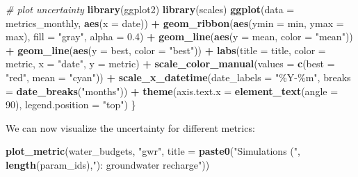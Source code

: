 \documentclass[
]{book}
\newenvironment{Shaded}{\begin{snugshade}}{\end{snugshade}}
\newcommand{\AttributeTok}[1]{\textcolor[rgb]{0.13,0.29,0.53}{#1}}
\newcommand{\CommentTok}[1]{\textcolor[rgb]{0.56,0.35,0.01}{\textit{#1}}}
\newcommand{\DecValTok}[1]{\textcolor[rgb]{0.00,0.00,0.81}{#1}}
\newcommand{\FloatTok}[1]{\textcolor[rgb]{0.00,0.00,0.81}{#1}}
\newcommand{\FunctionTok}[1]{\textcolor[rgb]{0.13,0.29,0.53}{\textbf{#1}}}
\newcommand{\NormalTok}[1]{#1}
\newcommand{\SpecialCharTok}[1]{\textcolor[rgb]{0.81,0.36,0.00}{\textbf{#1}}}
\newcommand{\StringTok}[1]{\textcolor[rgb]{0.31,0.60,0.02}{#1}}
\begin{document}
\begin{Shaded}
\begin{Highlighting}[]
  \CommentTok{\# plot uncertainty}
  \FunctionTok{library}\NormalTok{(ggplot2)}
  \FunctionTok{library}\NormalTok{(scales)}
  \FunctionTok{ggplot}\NormalTok{(}\AttributeTok{data =}\NormalTok{ metrics\_monthly, }\FunctionTok{aes}\NormalTok{(}\AttributeTok{x =}\NormalTok{ date)) }\SpecialCharTok{+}
    \FunctionTok{geom\_ribbon}\NormalTok{(}\FunctionTok{aes}\NormalTok{(}\AttributeTok{ymin =}\NormalTok{ min, }\AttributeTok{ymax =}\NormalTok{ max), }\AttributeTok{fill =} \StringTok{"gray"}\NormalTok{, }\AttributeTok{alpha =} \FloatTok{0.4}\NormalTok{) }\SpecialCharTok{+}
    \FunctionTok{geom\_line}\NormalTok{(}\FunctionTok{aes}\NormalTok{(}\AttributeTok{y =}\NormalTok{ mean, }\AttributeTok{color =} \StringTok{"mean"}\NormalTok{)) }\SpecialCharTok{+}
    \FunctionTok{geom\_line}\NormalTok{(}\FunctionTok{aes}\NormalTok{(}\AttributeTok{y =}\NormalTok{ best, }\AttributeTok{color =} \StringTok{"best"}\NormalTok{)) }\SpecialCharTok{+}
    \FunctionTok{labs}\NormalTok{(}\AttributeTok{title =}\NormalTok{ title, }\AttributeTok{color =}\NormalTok{ metric, }\AttributeTok{x =} \StringTok{"date"}\NormalTok{, }\AttributeTok{y =}\NormalTok{ metric) }\SpecialCharTok{+}
    \FunctionTok{scale\_color\_manual}\NormalTok{(}\AttributeTok{values =} \FunctionTok{c}\NormalTok{(}\AttributeTok{best =} \StringTok{"red"}\NormalTok{, }\AttributeTok{mean =} \StringTok{"cyan"}\NormalTok{)) }\SpecialCharTok{+}
    \FunctionTok{scale\_x\_datetime}\NormalTok{(}\AttributeTok{date\_labels =} \StringTok{"\%Y{-}\%m"}\NormalTok{, }\AttributeTok{breaks =} \FunctionTok{date\_breaks}\NormalTok{(}\StringTok{"months"}\NormalTok{)) }\SpecialCharTok{+}
    \FunctionTok{theme}\NormalTok{(}\AttributeTok{axis.text.x =} \FunctionTok{element\_text}\NormalTok{(}\AttributeTok{angle =} \DecValTok{90}\NormalTok{), }\AttributeTok{legend.position =} \StringTok{"top"}\NormalTok{)}
\NormalTok{\}}
\end{Highlighting}
\end{Shaded}

We can now visualize the uncertainty for different metrics:

\begin{Shaded}
\begin{Highlighting}[]
\FunctionTok{plot\_metric}\NormalTok{(water\_budgets, }\StringTok{"gwr"}\NormalTok{, }
            \AttributeTok{title =} \FunctionTok{paste0}\NormalTok{(}\StringTok{"Simulations ("}\NormalTok{, }\FunctionTok{length}\NormalTok{(param\_ids),}\StringTok{"): groundwater recharge"}\NormalTok{))}
\end{Highlighting}
\end{Shaded}
\end{document}
